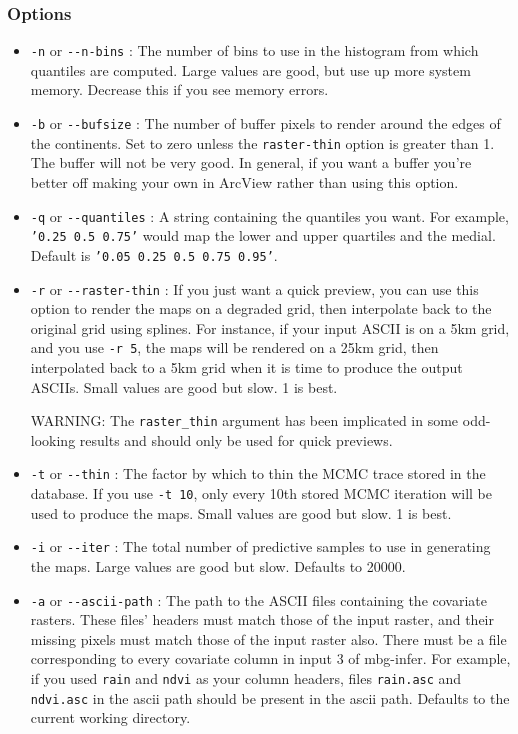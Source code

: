 \subsubsection{Options}
\label{sec:id7}
\begin{itemize}
\item {} 
\texttt{-n} or \texttt{-{}-n-bins} : The number of bins to use in the histogram from which quantiles
are computed. Large values are good, but use up more system memory. Decrease this if you
see memory errors.

\item {} 
\texttt{-b} or \texttt{-{}-bufsize} : The number of buffer pixels to render around the edges of the
continents. Set to zero unless the \texttt{raster-thin} option is greater than 1. The buffer
will not be very good. In general, if you want a buffer you're better off making your
own in ArcView rather than using this option.

\item {} 
\texttt{-q} or \texttt{-{}-quantiles} : A string containing the quantiles you want. For example,
\texttt{'0.25 0.5 0.75'} would map the lower and upper quartiles and the medial. Default is
\texttt{'0.05 0.25 0.5 0.75 0.95'}.

\item {} 
\texttt{-r} or \texttt{-{}-raster-thin} : If you just want a quick preview, you can use this option to
render the maps on a degraded grid, then interpolate back to the original grid using splines.
For instance, if your input ASCII is on a 5km grid, and you use \texttt{-r 5}, the maps will be
rendered on a 25km grid, then interpolated back to a 5km grid when it is time to produce
the output ASCIIs. Small values are good but slow. 1 is best.

WARNING: The \texttt{raster{\_}thin} argument has been implicated in some odd-looking results and
should only be used for quick previews.

\item {} 
\texttt{-t} or \texttt{-{}-thin} : The factor by which to thin the MCMC trace stored in the database.
If you use \texttt{-t 10}, only every 10th stored MCMC iteration will be used to produce the maps.
Small values are good but slow. 1 is best.

\item {} 
\texttt{-i} or \texttt{-{}-iter} : The total number of predictive samples to use in generating the maps.
Large values are good but slow. Defaults to 20000.

\item {} 
\texttt{-a} or \texttt{-{}-ascii-path} : The path to the ASCII files containing the covariate rasters.
These files' headers must match those of the input raster, and their missing pixels must match
those of the input raster also. There must be a file corresponding to every covariate column
in input 3 of mbg-infer. For example, if you used \texttt{rain} and \texttt{ndvi} as your column headers,
files \texttt{rain.asc} and \texttt{ndvi.asc} in the ascii path should be present in the ascii path.
Defaults to the current working directory.


\end{itemize}

